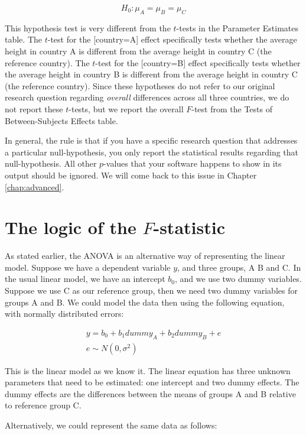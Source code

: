 \documentclass[]{book}\usepackage[]{graphicx}\usepackage[]{color}
\begin{document}
\begin{equation}
H_0: \mu_A= \mu_B=\mu_C
\end{equation}

This hypothesis test is very different from the $t$-tests in the Parameter Estimates table. The $t$-test for the [country=A] effect specifically tests whether the average height in country A is different from the average height in country C (the reference country). The $t$-test for the [country=B] effect specifically tests whether the average height in country B is different from the average height in country C (the reference country). Since these hypotheses do not refer to our original research question regarding \textit{overall} differences across all three countries, we do not report these $t$-tests, but we report the overall $F$-test from the Tests of Between-Subjects Effects table.

In general, the rule is that if you have a specific research question that addresses a particular null-hypothesis, you only report the statistical results regarding that null-hypothesis. All other $p$-values that your software happens to show in its output should be ignored. We will come back to this issue in Chapter \ref{chap:advanced}.


\section{The logic of the $F$-statistic}

As stated earlier, the ANOVA is an alternative way of representing the linear model. Suppose we have a dependent variable $y$, and three groups, A B and C. In the usual linear model, we have an intercept $b_0$, and we use two dummy variables. Suppose we use C as our reference group, then we need two dummy variables for groups A and B. We could model the data then using the following equation, with normally distributed errors:


\begin{eqnarray}
y = b_0 + b_1 dummy_A + b_2 dummy_B + e \\
e \sim N(0, \sigma^2)
\end{eqnarray}

This is the linear model as we know it. The linear equation has three unknown parameters that need to be estimated: one intercept and two dummy effects. The dummy effects are the differences between the means of groups A and B relative to reference group C. 

Alternatively, we could represent the same data as follows:
\end{document}
